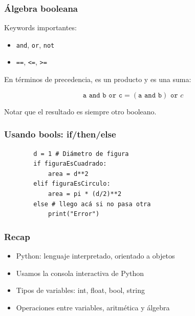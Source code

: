 \documentclass[14pt,aspectratio=169,xcolor=dvipsnames]{beamer}
\begin{document}
\begin{frame}\frametitle{Álgebra booleana}
    Keywords importantes: 
    \begin{itemize}
        \item \texttt{and}, \texttt{or}, \texttt{not}
        \item \texttt{==}, \texttt{<=}, \texttt{>=}
    \end{itemize}

En términos de precedencia,  es un producto y  es una suma: 

$$ \texttt{a and b or c} = (\texttt{a and b}) \texttt{ or } c $$

Notar que el resultado es siempre otro booleano.
\end{frame}
\begin{frame}[fragile]\frametitle{Usando bools: if/then/else}

    \begin{verbatim}
        d = 1 # Diámetro de figura
        if figuraEsCuadrado:
            area = d**2
        elif figuraEsCirculo:
            area = pi * (d/2)**2
        else # llego acá si no pasa otra
            print("Error")
    \end{verbatim}    
\end{frame}
\begin{frame}\frametitle{Recap}
    \begin{itemize}
        \item Python: lenguaje interpretado, orientado a objetos
        \item Usamos la consola interactiva de Python
        \item Tipos de variables: int, float, bool, string
        \item Operaciones entre variables, aritmética y álgebra
    \end{itemize}
\end{frame}
\begin{frame}
    \maketitle
\end{frame}
\end{document}
